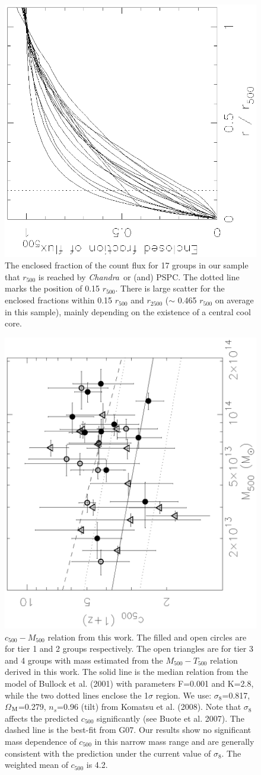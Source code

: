 \documentclass{aastex}
\def\chandra    {{\em Chandra}\/}
\begin{document}
\begin{figure}
\centerline{\includegraphics[height=0.4\linewidth,angle=270]{f20.ps}}
  \caption{The enclosed fraction of the count flux for 17 groups in our
sample that $r_{500}$ is reached by \chandra\ or (and) PSPC. The dotted line
marks the position of 0.15 $r_{500}$. There is large scatter for the
enclosed fractions within 0.15 $r_{500}$ and $r_{2500}$ ($\sim$ 0.465 $r_{500}$ on
average in this sample), mainly depending on the existence of a central cool core.
}
\end{figure}

\begin{figure}
\centerline{\includegraphics[height=0.45\linewidth,angle=270]{f21.ps}}
  \caption{$c_{500} - M_{500}$ relation from this work. The filled and open
circles are for tier 1 and 2 groups respectively. The open triangles are
for tier 3 and 4 groups with mass estimated from the $M_{500} - T_{500}$
relation derived in this work. The solid line is the median relation from the
model of Bullock et al. (2001) with parameters F=0.001 and K=2.8, while
the two dotted lines enclose the 1$\sigma$ region. We use:
$\sigma_{8}$=0.817, $\Omega$$_{\rm M}$=0.279, $n_{s}$=0.96 (tilt) from
Komatsu et al. (2008). Note that $\sigma_{8}$ affects the predicted $c_{500}$
significantly (see Buote et al. 2007). The dashed line is the best-fit from
G07. Our results show no significant mass dependence of $c_{500}$ in this
narrow mass range and are generally consistent with the prediction under the current
value of $\sigma_{8}$. The weighted mean of $c_{500}$ is 4.2.
}
\end{figure}
\end{document}
